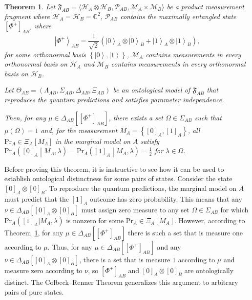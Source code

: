 \documentclass[DIV=calc,paper=a4,fontsize=11pt,twocolumn]{scrartcl} %
\theoremstyle{definition}
\theoremstyle{plain}
\newtheorem{theorem}[definition]{Theorem}
\newcommand{\Ket}[1]{\ensuremath{\left \vert #1 \right \rangle}}
\newcommand{\Proj}[1]{\ensuremath{\left [ #1 \right ]}}
\newcommand{\Hilb}[1][]{\ensuremath{\mathcal{H}_{#1}}}
\begin{document}
\begin{theorem}
\label{thm:CR:qubit}
Let $\mathfrak{F}_{AB} = \langle \Hilb[A] \otimes \Hilb[B],
\mathcal{P}_{AB}, \mathcal{M}_A \times \mathcal{M}_B \rangle$ be a
product measurement fragment where $\Hilb[A] = \Hilb[B] =
\mathbb{C}^2$, $\mathcal{P}_{AB}$ contains the maximally entangled
state $\Proj{\Phi^+}_{AB}$, where
\begin{equation}
\Ket{\Phi^+}_{AB} = \frac{1}{\sqrt{2}} \left ( \Ket{0}_A \otimes
\Ket{0}_B  + \Ket{1}_A \otimes \Ket{1}_B \right ),
\end{equation}
for some orthonormal basis $\left \{ \Ket{0}, \Ket{1} \right \}$,
$\mathcal{M}_A$ contains measurements in every orthonormal basis on
$\Hilb[A]$ and $\mathcal{M}_B$ contains measurements in every
orthonormal basis on $\Hilb[B]$.

Let $\Theta_{AB} = (\Lambda_{AB}, \Sigma_{AB}, \Delta_{AB}, \Xi_{AB})$
be an ontological model of $\mathfrak{F}_{AB}$ that reproduces the
quantum predictions and satisfies parameter independence.

Then, for any $\mu \in \Delta_{AB}\left [ \Proj{\Phi^+}_{AB} \right
]$, there exists a set $\Omega \in \Sigma_{AB}$ such that
$\mu(\Omega) = 1$ and, for the measurement $M_A = \left
\{\Proj{0}_A, \Proj{1}_A \right \}$, all $\mathrm{Pr}_A \in
\Xi_A[M_A]$ in the marginal model on $A$ satisfy $\mathrm{Pr}_A
\left ( \Proj{0}_A \middle | M_A,\lambda \right ) = \mathrm{Pr}_A
\left ( \Proj{1}_A \middle | M_A,\lambda \right ) = \frac{1}{2}$ for
$\lambda \in \Omega$.
\end{theorem}

Before proving this theorem, it is instructive to see how it can be
used to establish ontological distinctness for some pairs of states.
Consider the state $\Proj{0}_A \otimes \Proj{0}_B$.  To reproduce the
quantum predictions, the marginal model on $A$ must predict that the
$\Proj{1}_A$ outcome has zero probability.  This means that any $\nu
\in \Delta_{AB}[\Proj{0}_A \otimes \Proj{0}_B]$ must assign zero
measure to any set $\Omega \in \Sigma_{AB}$ for which
$\text{Pr}_A(\Proj{1}_A|M_A,\lambda)$ is nonzero for some $\text{Pr}_A
\in \Xi_A[M_A]$.  However, according to Theorem~\ref{thm:CR:qubit},
for any $\mu \in \Delta_{AB} \left [ \Proj{\Phi^+}_{AB} \right ]$
there is such a set that is measure one according to $\mu$.  Thus, for
any $\mu \in \Delta_{AB} \left [ \Proj{\Phi^+}_{AB} \right ]$ and any
$\nu \in \Delta_{AB} \left [ \Proj{0}_A \otimes \Proj{0}_B \right ]$,
there is a set that is measure $1$ according to $\mu$ and measure zero
according to $\nu$, so $\Proj{\Phi^+}_{AB}$ and $\Proj{0}_A \otimes
\Proj{0}_B$ are ontologically distinct.  The Colbeck--Renner Theorem
generalizes this argument to arbitrary pairs of pure states.
\end{document}
